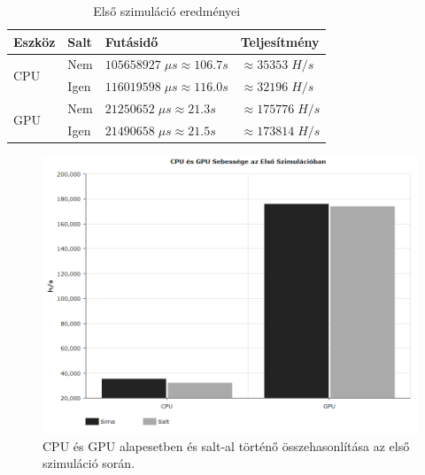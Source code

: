 \begin{table}[H]
    \centering
    \begin{tabular}{l|l|l|l}
        \textbf{Eszköz} & \textbf{Salt} & \textbf{Futásidő} & \textbf{Teljesítmény}  \\
        \hline
        \hline
        \multirow{2}{*}{CPU} & Nem & $\num{105 658 927} \; \mu s \approx \num{106.7}s$ & $\approx \num{35 353} \; H/s$ \\
                             \cline{2-4}
                             & Igen & $\num{116 019 598} \; \mu s \approx \num{116.0}s$ & $\approx \num{32 196} \; H/s$ \\
                             \hline
                             
        \multirow{2}{*}{GPU} & Nem & $\num{21 250 652} \; \mu s \approx \num{21.3}s$ & $\approx \num{175 776} \; H/s$ \\
                             \cline{2-4}
                             & Igen & $\num{21 490 658} \; \mu s \approx \num{21.5}s$ & $\approx \num{173 814} \; H/s$ \\
    \end{tabular}
    \caption{Első szimuláció eredményei}
\end{table}


\begin{figure}[H]
    \centering
    \includegraphics[width=\textwidth]{images/charts/performance-1.png}
    \caption{CPU és GPU alapesetben és salt-al történő összehasonlítása az első szimuláció során.}
\end{figure}


